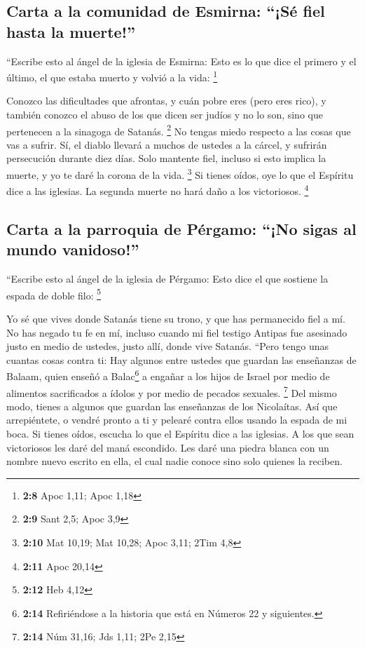 \hypertarget{carta-a-la-comunidad-de-esmirna-suxe9-fiel-hasta-la-muerte}{%
\subsection{Carta a la comunidad de Esmirna: ``¡Sé fiel hasta la
muerte!''}\label{carta-a-la-comunidad-de-esmirna-suxe9-fiel-hasta-la-muerte}}

 ``Escribe esto al ángel de la iglesia de Esmirna: Esto es
lo que dice el primero y el último, el que estaba muerto y volvió a la
vida: \footnote{\textbf{2:8} Apoc 1,11; Apoc 1,18}

 Conozco las dificultades que afrontas, y cuán pobre eres
(pero eres rico), y también conozco el abuso de los que dicen ser judíos
y no lo son, sino que pertenecen a la sinagoga de Satanás. \footnote{\textbf{2:9}
  Sant 2,5; Apoc 3,9}  No tengas miedo respecto a las
cosas que vas a sufrir. Sí, el diablo llevará a muchos de ustedes a la
cárcel, y sufrirán persecución durante diez días. Solo mantente fiel,
incluso si esto implica la muerte, y yo te daré la corona de la vida.
\footnote{\textbf{2:10} Mat 10,19; Mat 10,28; Apoc 3,11; 2Tim 4,8}
 Si tienes oídos, oye lo que el Espíritu dice a las
iglesias. La segunda muerte no hará daño a los victoriosos. \footnote{\textbf{2:11}
  Apoc 20,14}

\hypertarget{carta-a-la-parroquia-de-puxe9rgamo-no-sigas-al-mundo-vanidoso}{%
\subsection{Carta a la parroquia de Pérgamo: ``¡No sigas al mundo
vanidoso!''}\label{carta-a-la-parroquia-de-puxe9rgamo-no-sigas-al-mundo-vanidoso}}

 ``Escribe esto al ángel de la iglesia de Pérgamo: Esto
dice el que sostiene la espada de doble filo: \footnote{\textbf{2:12}
  Heb 4,12}

 Yo sé que vives donde Satanás tiene su trono, y que has
permanecido fiel a mí. No has negado tu fe en mí, incluso cuando mi fiel
testigo Antipas fue asesinado justo en medio de ustedes, justo allí,
donde vive Satanás.  ``Pero tengo unas cuantas cosas
contra ti: Hay algunos entre ustedes que guardan las enseñanzas de
Balaam, quien enseñó a Balac\footnote{\textbf{2:14} Refiriéndose a la
  historia que está en Números 22 y siguientes.} a engañar a los hijos
de Israel por medio de alimentos sacrificados a ídolos y por medio de
pecados sexuales. \footnote{\textbf{2:14} Núm 31,16; Jds 1,11; 2Pe 2,15}
 Del mismo modo, tienes a algunos que guardan las
enseñanzas de los Nicolaítas.  Así que arrepiéntete, o
vendré pronto a ti y pelearé contra ellos usando la espada de mi boca.
 Si tienes oídos, escucha lo que el Espíritu dice a las
iglesias. A los que sean victoriosos les daré del maná escondido. Les
daré una piedra blanca con un nombre nuevo escrito en ella, el cual
nadie conoce sino solo quienes la reciben.

